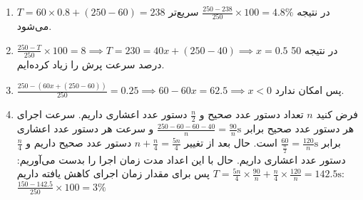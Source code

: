 \begin{enumerate}[leftmargin=0cm,itemindent=.5cm,label=\alph*.]
    \item $T = 60 \times 0.8 + (250 - 60) = 238$ در نتیجه $\frac{250-238}{250} \times 100 = 4.8\%$ سریع‌تر می‌شود.
    \item $\frac{250 - T}{250} \times 100 = 8 \implies T = 230 = 40x + (250 - 40) \implies x = 0.5$ در نتیجه 50 درصد سرعت پرش را زیاد کرده‌ایم.
    \item $\frac{250 - (60x + (250 - 60))}{250} = 0.25 \implies 60 - 60x = 62.5 \implies x < 0$ پس امکان ندارد.
    \item فرض کنید
    $n$
    تعداد دستور عدد صحیح و
    $\frac{n}{2}$
    دستور عدد اعشاری داریم.
    سرعت اجرای هر دستور عدد صحیح برابر
    $\frac{250-60-60-40}{n} = \frac{90}{n} \text{s}$
    و سرعت هر دستور عدد اعشاری برابر
    $\frac{60}{\frac{n}{2}} = \frac{120}{n} \text{s}$
    است.
    حال بعد از تغییر
    $n + \frac{n}{4} = \frac{5n}{4}$
    دستور عدد صحیح داریم و
    $\frac{n}{4}$
    دستور عدد اعشاری داریم.
    حال با این اعداد مدت زمان اجرا را بدست می‌آوریم:
    $T = \frac{5n}{4} \times \frac{90}{n} + \frac{n}{4} \times \frac{120}{n} = 142.5 \text{s}$
    پس برای مقدار زمان اجرای کاهش یافته داریم:
    $\frac{150-142.5}{250} \times 100 = 3\%$
\end{enumerate}